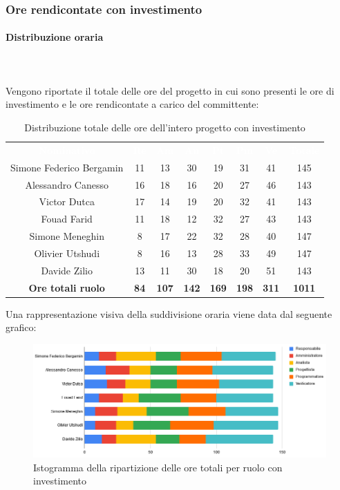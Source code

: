 \subsubsection{Ore rendicontate con investimento}
\paragraph{Distribuzione oraria} \mbox{} \\ \mbox{} \\
Vengono riportate il totale delle ore del progetto in cui sono presenti le ore di investimento e le
ore rendicontate a carico del committente:

\begin{table}[H]
\centering\renewcommand{\arraystretch}{1.5}
\caption{Distribuzione totale delle ore dell'intero progetto con investimento}
\vspace{0.2cm}
\begin{tabular}{ c c c c c c c c }
\rowcolor{redafk}
\textcolor{white}{\textbf{Nominativo}} & \textcolor{white}{\textbf{Re}} & 
\textcolor{white}{\textbf{Am}} & \textcolor{white}{\textbf{An}} &
\textcolor{white}{\textbf{Pt}} & \textcolor{white}{\textbf{Pm}} &
\textcolor{white}{\textbf{Ve}} & \textcolor{white}{\textbf{Totale}} \\
Simone Federico Bergamin 	& 11 	& 13 	& 30 	& 19 	& 31 	& 41 	& 145 \\
Alessandro Canesso 			& 16 	& 18 	& 16 	& 20 	& 27 	& 46 	& 143 \\
Victor Dutca 				& 17	& 14 	& 19 	& 20 	& 32 	& 41 	& 143 \\
Fouad Farid					& 11	& 18 	& 12 	& 32 	& 27 	& 43 	& 143 \\
Simone Meneghin 			& 8 	& 17 	& 22 	& 32 	& 28 	& 40 	& 147 \\
Olivier Utshudi 			& 8 	& 16 	& 13 	& 28 	& 33 	& 49 	& 147 \\
Davide Zilio 				& 13 	& 11 	& 30 	& 18 	& 20 	& 51 	& 143 \\
\rowcolor{lastrowcolor}
\textbf{Ore totali ruolo} & \textbf{84} & \textbf{107} & \textbf{142} & \textbf{169} & \textbf{198} & \textbf{311} & \textbf{1011} \\
\end{tabular}
\end{table}

Una rappresentazione visiva della suddivisione oraria viene data dal seguente grafico:
\begin{figure}[H]
\centering
\includegraphics[scale=0.60]{img/grafici/tabella_tot_con_analisi.png}
\caption{Istogramma della ripartizione delle ore totali per ruolo con investimento}
\end{figure}

